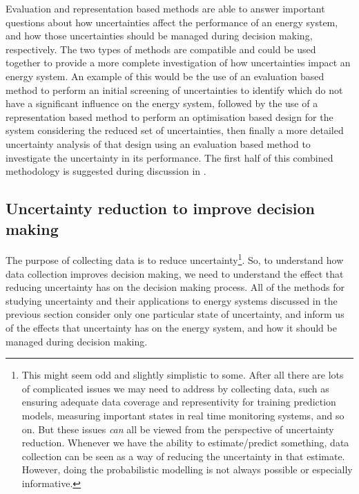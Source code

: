 Evaluation and representation based methods are able to answer important questions about how uncertainties affect the performance of an energy system, and how those uncertainties should be managed during decision making, respectively. The two types of methods are compatible and could be used together to provide a more complete investigation of how uncertainties impact an energy system. An example of this would be the use of an evaluation based method to perform an initial screening of uncertainties to identify which do not have a significant influence on the energy system, followed by the use of a representation based method to perform an optimisation based design for the system considering the reduced set of uncertainties, then finally a more detailed uncertainty analysis of that design using an evaluation based method to investigate the uncertainty in its performance.
The first half of this combined methodology is suggested during discussion in .



\subsection{Uncertainty reduction to improve decision making} \label{sec:uncertainty-reduction-lit}


The purpose of collecting data is to reduce uncertainty\footnote{This might seem odd and slightly simplistic to some. After all there are lots of complicated issues we may need to address by collecting data, such as ensuring adequate data coverage and representivity for training prediction models, measuring important states in real time monitoring systems, and so on. But these issues \textit{can} all be viewed from the perspective of uncertainty reduction. Whenever we have the ability to estimate/predict something, data collection can be seen as a way of reducing the uncertainty in that estimate. However, doing the probabilistic modelling is not always possible or especially informative.}.
So, to understand how data collection improves decision making, we need to understand the effect that reducing uncertainty has on the decision making process.
All of the methods for studying uncertainty and their applications to energy systems discussed in the previous section consider only one particular state of uncertainty, and inform us of the effects that uncertainty has on the energy system, and how it should be managed during decision making.\\

